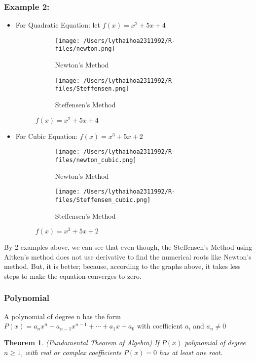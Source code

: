\documentclass[12pt]{article}
\newtheorem{theorem}{Theorem}[subsection]
\begin{document}
\subsubsection{Example 2:}
\begin{itemize}
	\item For Quadratic Equation: 
	let $f(x) = x^2 +5x +4$
	\begin{figure}[H]
\begin{subfigure}{.5\textwidth}
  \centering
  \texttt{[image: /Users/lythaihoa2311992/R-files/newton.png]}
  \caption{Newton's Method}
  \label{fig:sfig2}
\end{subfigure}
\begin{subfigure}{.5\textwidth}
  \centering
  \texttt{[image: /Users/lythaihoa2311992/R-files/Steffensen.png]}
  \caption{Steffensen's Method}
  \label{fig:sfig2}
\end{subfigure}

\label{fig:fig}
\caption{$f(x) = x^2 +5x +4$}

\end{figure}
\item For Cubic Equation: $f(x) = x^3 + 5x + 2$
\begin{figure}[H]
\begin{subfigure}{.5\textwidth}
  \centering
  \texttt{[image: /Users/lythaihoa2311992/R-files/newton\_cubic.png]}
  \caption{Newton's Method}
  \label{fig:sfig2}
\end{subfigure}
\begin{subfigure}{.5\textwidth}
  \centering
  \texttt{[image: /Users/lythaihoa2311992/R-files/Steffensen\_cubic.png]}
  \caption{Steffensen's Method}
  \label{fig:sfig2}
\end{subfigure}

\label{fig:fig}
\caption{$f(x) = x^3 +5x +2$}

\end{figure}

\end{itemize}
By 2 examples above, we can see that even though, the Steffensen's Method using Aitken's method  does not use derivative to find the numerical roots like Newton's method. But, it is better; because, according to the graphs above, it takes less steps to make the equation converges to zero.


\subsubsection{Polynomial}
A polynomial of degree n has the form $P(x) = a_nx^n +a_{n-1}x^{n-1} + \cdots +a_1x + a_0$ with coefficient $a_i$ and $a_n \neq 0$
\begin{theorem}{(Fundamental Theorem of Algebra)}
\newline If $P(x)$ polynomial of degree $n \geq 1$, with real or complex coefficients $P(x) = 0$ has at least one root. 	
\end{theorem} 
\end{document}
